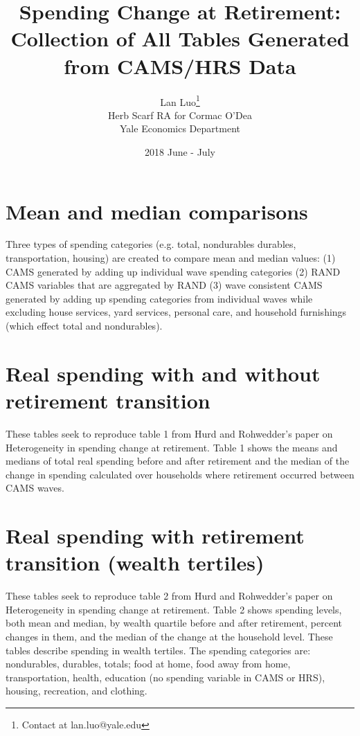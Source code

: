 \documentclass{article}
\title{\textbf{Spending Change at Retirement: Collection of All Tables Generated from CAMS/HRS Data}}
\date{2018 June - July}
\author{Lan Luo\footnote{Contact at lan.luo@yale.edu} \\ Herb Scarf RA for Cormac O'Dea\\ Yale Economics Department}
\begin{document}
\maketitle
\tableofcontents
\newpage

\section{Mean and median comparisons}
Three types of spending categories (e.g. total, nondurables durables, transportation, housing) are created to compare mean and median values: (1) CAMS generated by adding up individual wave spending categories (2) RAND CAMS variables that are aggregated by RAND (3) wave consistent CAMS generated by adding up spending categories from individual waves while excluding house services, yard services, personal care, and household furnishings (which effect total and nondurables).



 
\FloatBarrier

\section{Real spending with and without retirement transition} 
These tables seek to reproduce table 1 from Hurd and Rohwedder's paper on Heterogeneity in spending change at retirement. Table 1 shows the means and medians of total real spending before and after retirement and the median of the change in spending calculated over households where retirement occurred between CAMS waves.


\FloatBarrier

\section{Real spending with retirement transition (wealth tertiles)} 
These tables seek to reproduce table 2 from Hurd and Rohwedder's paper on Heterogeneity in spending change at retirement. Table 2 shows spending levels, both mean and median, by wealth quartile before and after retirement, percent changes in them, and the median of the change at the household level. 
\newline
\newline
These tables describe spending in wealth tertiles. The spending categories are: nondurables, durables, totals; food at home, food away from home, transportation, health, education (no spending variable in CAMS or HRS), housing, recreation, and clothing.











\FloatBarrier
\end{document}

